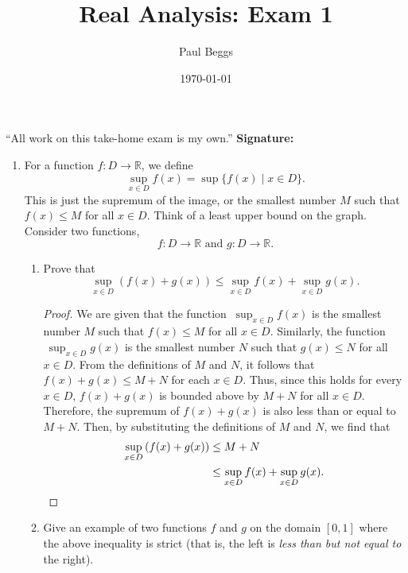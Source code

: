 \documentclass[12pt]{article}
\title{Real Analysis: Exam 1}
\author{Paul Beggs}
\date{\today}
\newcommand{\R}{\ensuremath{\mathbb{R}}}
\begin{document}
\maketitle

``All work on this take-home exam is my own.'' \hfill \textbf{Signature:} \underline{\hspace{5cm}}

\vspace{0.5cm}
\begin{enumerate}
    \item For a function \(f \colon D \rightarrow \R\), we define \[\displaystyle \sup_{x \in D} f(x) = \sup\{f(x) \mid x \in D\}.\] This is just the supremum of the image, or the smallest number \(M\) such that \(f(x) \leq M\) for all \(x \in D\). Think of a least upper bound on the graph. \\

          Consider two functions,
          \[f \colon D \rightarrow \R \text{ and } g \colon D \rightarrow \R.\]
          \begin{enumerate}
              \item Prove that \[\displaystyle \sup_{x \in D} (f(x) + g(x)) \leq \sup_{x \in D} f(x) + \sup_{x \in D} g(x).\]
                    \begin{proof}
                        We are given that the function \(\ \sup_{x \in D} f(x)\) is the smallest number \(M\) such that \(f(x) \leq M\) for all \(x \in D\). Similarly, the function \(\ \sup_{x \in D} g(x)\) is the smallest number \(N\) such that \(g(x) \leq N\) for all \(x \in D\). From the definitions of \(M\) and \(N\), it follows that \(f(x) + g(x) \leq M + N\) for each \(x \in D\). Thus, since this holds for every \(x \in D\), \(f(x) + g(x)\) is bounded above by \(M + N\) for all \(x \in D\). Therefore, the supremum of \(f(x) + g(x)\) is also less than or equal to \(M + N\). Then, by substituting the definitions of \(M\) and \(N\), we find that
                        \begin{align*}
                            \displaystyle \sup_{x \in D} \left(f(x) + g(x)\right) & \leq M + N                                               \\
                                                                                  & \leq \sup_{x \in D} f(x) + \sup_{x \in D} g(x). \qedhere
                        \end{align*}
                    \end{proof}
              \item Give an example of two functions \(f\) and \(g\) on the domain \([0,1]\) where the above inequality is strict (that is, the left is \textit{less than but not equal to} the right). \\


\end{enumerate}
\end{enumerate}
\end{document}
